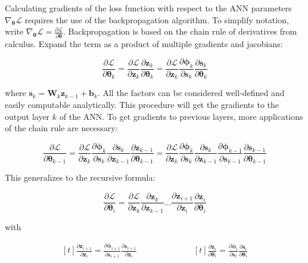 \documentclass[12pt,a4paper]{book}
\begin{document}
Calculating gradients of the loss function with respect to the ANN parameters $\nabla_{\bm{\theta}} \mathcal{L}$ requires the use of the backpropagation algorithm. To simplify notation, write $\nabla_{\bm{\theta}} \mathcal{L} = \frac{\partial \mathcal{L}}{\partial \bm{\theta}}$. Backpropagation is based on the chain rule of derivatives from calculus. Expand the term as a product of multiple gradients and jacobians:

\begin{equation}
    \frac{\partial \mathcal{L}}{\partial \bm{\theta}_k}
    = \frac{\partial \mathcal{L}}{\partial \bm{z}_k} \frac{\partial \bm{z}_k}{\partial \bm{\theta}_k}
    = \frac{\partial \mathcal{L}}{\partial \bm{z}_k} \frac{\partial \bm{\phi}_k}{\partial \bm{s}_k} \frac{\partial \bm{s}_k}{\partial \bm{\theta}_k}
\end{equation}

\noindent where $\bm{s}_k = \bm{W}_k \bm{z}_{k-1} + \bm{b}_k$. All the factors can be considered well-defined and easily computable analytically. This procedure will get the gradients to the output layer $k$ of the ANN. To get gradients to previous layers, more applications of the chain rule are necessary:

\begin{equation}
    \frac{\partial \mathcal{L}}{\partial \bm{\theta}_{k-1}}
    = \frac{\partial \mathcal{L}}{\partial \bm{z}_k} \frac{\partial \bm{\phi}_k}{\partial \bm{s}_k} \frac{\partial \bm{s}_k}{\partial \bm{z}_{k-1}} \frac{\partial \bm{z}_{k-1}}{\partial \bm{\theta}_{k-1}}
    = \frac{\partial \mathcal{L}}{\partial \bm{z}_k} \frac{\partial \bm{\phi}_k}{\partial \bm{s}_k} \frac{\partial \bm{s}_k}{\partial \bm{z}_{k-1}} \frac{\partial \bm{\phi}_{k-1}}{\partial \bm{s}_{k-1}} \frac{\partial \bm{s}_{k-1}}{\partial \bm{\theta}_{k-1}}
\end{equation}

This generalizes to the recursive formula:

\begin{equation}
    \frac{\partial \mathcal{L}}{\partial \bm{\theta}_{i}}
    = \frac{\partial \mathcal{L}}{\partial \bm{z}_k} \frac{\partial \bm{z}_k}{\partial \bm{z}_{k-1}} \dots \frac{\partial \bm{z}_{i+1}}{\partial \bm{z}_i} \frac{\partial \bm{z}_i}{\partial \bm{\theta}_i}
\label{eq:backprop}
\end{equation}

\noindent with

\begin{equation}
\begin{aligned}[t]
    \frac{\partial \bm{z}_{i+1}}{\partial \bm{z}_i}
    = \frac{\partial \bm{\phi}_{i+1}}{\partial \bm{s}_{i+1}} \frac{\partial \bm{s}_{i+1}}{\partial \bm{z}_i}
\end{aligned}
\qquad
\qquad
\qquad
\begin{aligned}[t]
    \frac{\partial \bm{z}_i}{\partial \bm{\theta}_i}
    = \frac{\partial \bm{\phi}_i}{\partial \bm{s}_i} \frac{\partial \bm{s}_i}{\partial \bm{\theta}_i}
\end{aligned}
\end{equation}
\end{document}
